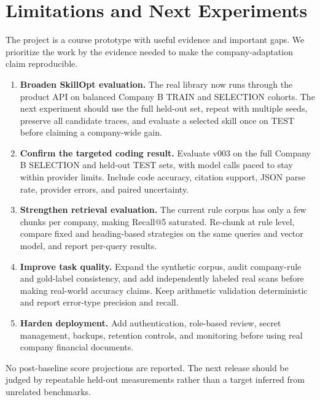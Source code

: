 \section{Limitations and Next Experiments}
\label{sec:roadmap}

The project is a course prototype with useful evidence and important gaps. We
prioritize the work by the evidence needed to make the company-adaptation claim
reproducible.

\begin{enumerate}[leftmargin=*, itemsep=3pt]
  \item \textbf{Broaden SkillOpt evaluation.} The real library now runs through
        the product API on balanced Company B TRAIN and SELECTION cohorts. The
        next experiment should use the full held-out set, repeat with multiple
        seeds, preserve all candidate traces, and evaluate a selected skill
        once on TEST before claiming a company-wide gain.
  \item \textbf{Confirm the targeted coding result.} Evaluate v003 on the full
        Company B SELECTION and held-out TEST sets, with model calls paced to
        stay within provider limits. Include code accuracy, citation support,
        JSON parse rate, provider errors, and paired uncertainty.
  \item \textbf{Strengthen retrieval evaluation.} The current rule corpus has
        only a few chunks per company, making Recall@5 saturated. Re-chunk at
        rule level, compare fixed and heading-based strategies on the same
        queries and vector model, and report per-query results.
  \item \textbf{Improve task quality.} Expand the synthetic corpus, audit
        company-rule and gold-label consistency, and add independently labeled
        real scans before making real-world accuracy claims. Keep arithmetic
        validation deterministic and report error-type precision and recall.
  \item \textbf{Harden deployment.} Add authentication, role-based review,
        secret management, backups, retention controls, and monitoring before
        using real company financial documents.
\end{enumerate}

No post-baseline score projections are reported. The next release should be
judged by repeatable held-out measurements rather than a target inferred from
unrelated benchmarks.
